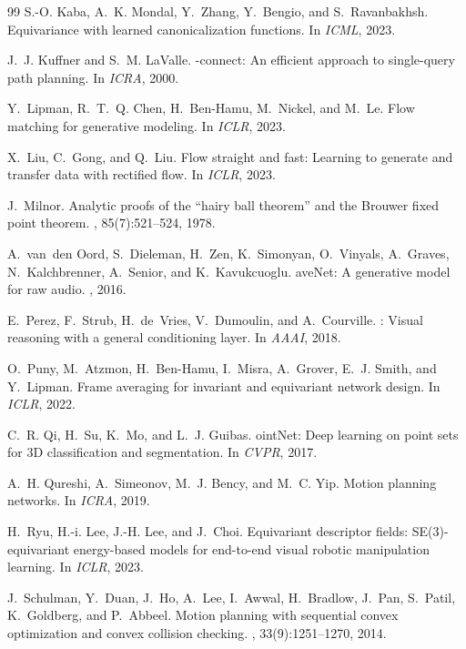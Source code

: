 \documentclass[10pt,twocolumn,letterpaper]{article}
\begin{document}
\begin{thebibliography}{99}
S.-O. Kaba, A.~K. Mondal, Y.~Zhang, Y.~Bengio, and S.~Ravanbakhsh.
\newblock Equivariance with learned canonicalization functions.
\newblock In {\em ICML}, 2023.

J.~J. Kuffner and S.~M. LaValle.
-connect: An efficient approach to single-query path planning.
\newblock In {\em ICRA}, 2000.

Y.~Lipman, R.~T.~Q. Chen, H.~Ben-Hamu, M.~Nickel, and M.~Le.
\newblock Flow matching for generative modeling.
\newblock In {\em ICLR}, 2023.

X.~Liu, C.~Gong, and Q.~Liu.
\newblock Flow straight and fast: Learning to generate and transfer data with
  rectified flow.
\newblock In {\em ICLR}, 2023.

J.~Milnor.
\newblock Analytic proofs of the ``hairy ball theorem'' and the {B}rouwer fixed
  point theorem.
, 85(7):521--524, 1978.

A.~van~den Oord, S.~Dieleman, H.~Zen, K.~Simonyan, O.~Vinyals, A.~Graves,
  N.~Kalchbrenner, A.~Senior, and K.~Kavukcuoglu.
ave{N}et: A generative model for raw audio.
, 2016.

E.~Perez, F.~Strub, H.~de~Vries, V.~Dumoulin, and A.~Courville.
: Visual reasoning with a general conditioning layer.
\newblock In {\em AAAI}, 2018.

O.~Puny, M.~Atzmon, H.~Ben-Hamu, I.~Misra, A.~Grover, E.~J. Smith, and
  Y.~Lipman.
\newblock Frame averaging for invariant and equivariant network design.
\newblock In {\em ICLR}, 2022.

C.~R. Qi, H.~Su, K.~Mo, and L.~J. Guibas.
oint{N}et: Deep learning on point sets for 3{D} classification and
  segmentation.
\newblock In {\em CVPR}, 2017.

A.~H. Qureshi, A.~Simeonov, M.~J. Bency, and M.~C. Yip.
\newblock Motion planning networks.
\newblock In {\em ICRA}, 2019.

H.~Ryu, H.-i. Lee, J.-H. Lee, and J.~Choi.
\newblock Equivariant descriptor fields: {SE(3)}-equivariant energy-based models
  for end-to-end visual robotic manipulation learning.
\newblock In {\em ICLR}, 2023.

J.~Schulman, Y.~Duan, J.~Ho, A.~Lee, I.~Awwal, H.~Bradlow, J.~Pan, S.~Patil,
  K.~Goldberg, and P.~Abbeel.
\newblock Motion planning with sequential convex optimization and convex
  collision checking.
, 33(9):1251--1270, 2014.


\end{thebibliography}
\end{document}
